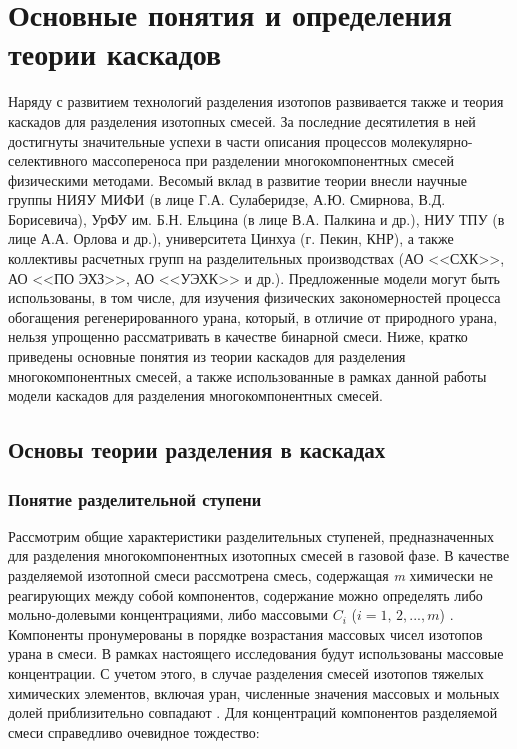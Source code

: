 \chapter{Основные понятия и определения теории каскадов}\label{ch2_theory}

Наряду с развитием технологий разделения изотопов развивается также и теория каскадов для разделения изотопных смесей. За последние десятилетия в ней достигнуты значительные успехи в части описания процессов молекулярно-селективного массопереноса при разделении многокомпонентных смесей физическими методами. Весомый вклад в развитие теории внесли научные группы НИЯУ МИФИ (в лице Г.А. Сулаберидзе, А.Ю. Смирнова, В.Д. Борисевича), УрФУ им. Б.Н. Ельцина (в лице В.А. Палкина и др.), НИУ ТПУ (в лице А.А. Орлова и др.), университета Цинхуа (г. Пекин, КНР), а также коллективы расчетных групп на разделительных производствах (АО <<СХК>>, АО <<ПО ЭХЗ>>, АО <<УЭХК>> и др.). Предложенные модели могут быть использованы, в том числе, для изучения физических закономерностей процесса обогащения регенерированного урана, который, в отличие от природного урана, нельзя упрощенно рассматривать в качестве бинарной смеси.
Ниже, кратко приведены основные понятия из теории каскадов для разделения многокомпонентных смесей, а также использованные в рамках данной работы модели каскадов для разделения многокомпонентных смесей.

\section{Основы теории разделения в каскадах}


\subsection{Понятие разделительной ступени}

Рассмотрим общие характеристики разделительных ступеней, предназначенных для разделения многокомпонентных изотопных смесей в газовой фазе. В качестве разделяемой изотопной смеси рассмотрена смесь, содержащая \textit{m} химически не реагирующих между собой компонентов, содержание можно определять либо мольно-долевыми концентрациями, либо массовыми $C_{i}$ ($i=1,\, 2,...,m$) \cite{sulaberidzeTeoriyaKaskadovDlya2011}. Компоненты пронумерованы в порядке возрастания массовых чисел изотопов урана в смеси. В рамках настоящего исследования будут использованы массовые концентрации. С учетом этого, в случае разделения смесей изотопов тяжелых химических элементов, включая уран, численные значения массовых и мольных долей приблизительно совпадают \cite{sulaberidzeTeoriyaKaskadovDlya2011}.  Для концентраций компонентов разделяемой смеси справедливо очевидное тождество:

